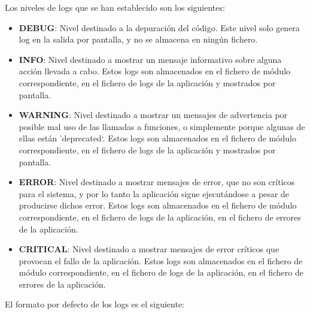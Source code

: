 Los niveles de logs que se han establecido son los siguientes:

\begin{itemize}

\item \textbf{DEBUG}: Nivel destinado a la depuración del código. Este nivel solo genera log en la salida por pantalla, y no se almacena en ningún fichero.

\item \textbf{INFO}: Nivel destinado a mostrar un mensaje informativo sobre alguna acción llevada a cabo. Estos logs son almacenados en el fichero de módulo correspondiente, en el fichero de logs de la aplicación y mostrados por pantalla.

\item \textbf{WARNING}: Nivel destinado a mostrar un mensajes de advertencia por posible mal uso de las llamadas a funciones, o simplemente porque algunas de ellas están '{deprecated}`. Estos logs son almacenados en el fichero de módulo correspondiente, en el fichero de logs de la aplicación y mostrados por pantalla.

\item \textbf{ERROR}: Nivel destinado a mostrar mensajes de error, que no son críticos para el sistema, y por lo tanto la aplicación sigue ejecutándose a pesar de producirse dichos error. Estos logs son almacenados en el fichero de módulo correspondiente, en el fichero de logs de la aplicación, en el fichero de errores de la aplicación.

\item \textbf{CRITICAL}: Nivel destinado a mostrar mensajes de error críticos que provocan el fallo de la aplicación. Estos logs son almacenados en el fichero de módulo correspondiente, en el fichero de logs de la aplicación, en el fichero de errores de la aplicación.

\end{itemize}



El formato por defecto de los logs es el siguiente:


